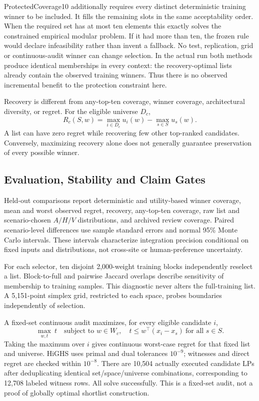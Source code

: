 \documentclass{llncs}
\begin{document}
ProtectedCoverage10 additionally requires every distinct deterministic training winner to be included. It fills the remaining slots in the same acceptability order. When the required set has at most ten elements this exactly solves the constrained empirical modular problem. If it had more than ten, the frozen rule would declare infeasibility rather than invent a fallback. No test, replication, grid or continuous-audit winner can change selection. In the actual run both methods produce identical memberships in every context: the recovery-optimal lists already contain the observed training winners. Thus there is no observed incremental benefit to the protection constraint here.

Recovery is different from any-top-ten coverage, winner coverage, architectural diversity, or regret. For the eligible universe $D_c$,
\begin{equation}
 R_c(S,w)=\max_{i\in D_c}u_i(w)-\max_{s\in S}u_s(w).
\end{equation}
A list can have zero regret while recovering few other top-ranked candidates. Conversely, maximizing recovery alone does not generally guarantee preservation of every possible winner.

\subsection{Evaluation, Stability and Claim Gates}
Held-out comparisons report deterministic and utility-based winner coverage, mean and worst observed regret, recovery, any-top-ten coverage, raw list and scenario-chosen $A/H/V$ distributions, and archived review coverage. Paired scenario-level differences use sample standard errors and normal 95\% Monte Carlo intervals. These intervals characterize integration precision conditional on fixed inputs and distributions, not cross-site or human-preference uncertainty.

For each selector, ten disjoint 2,000-weight training blocks independently reselect a list. Block-to-full and pairwise Jaccard overlaps describe sensitivity of membership to training samples. This diagnostic never alters the full-training list. A 5,151-point simplex grid, restricted to each space, probes boundaries independently of selection.

A fixed-set continuous audit maximizes, for every eligible candidate $i$,
\begin{equation}
 \max_{w,t}\ t\quad\text{subject to }w\in W_c,\quad
 t\leq w^\top(x_i-x_s)\ \text{for all }s\in S.
\end{equation}
Taking the maximum over $i$ gives continuous worst-case regret for that fixed list and universe. HiGHS uses primal and dual tolerances $10^{-9}$; witnesses and direct regret are checked within $10^{-8}$. There are 10,504 actually executed candidate LPs after deduplicating identical set/space/universe combinations, corresponding to 12,708 labeled witness rows. All solve successfully. This is a fixed-set audit, not a proof of globally optimal shortlist construction.
\end{document}
